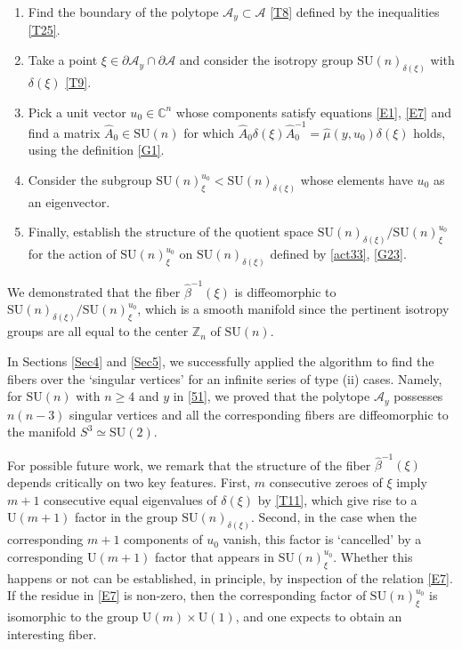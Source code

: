 \documentclass[a4paper,11pt,reqno]{amsart}
\theoremstyle{definition}
\numberwithin{equation}{section}
\def\cA{{\mathcal A}}                       %
\def\bC{{\mathbb C}}                        %
\def\bZ{{\mathbb Z}}                        %
\def\SU{\mathrm{SU}}                        %
\def\U{\mathrm{U}}                          %
\begin{document}
\begin{enumerate}

\item{Find the boundary of the polytope $\cA_y\subset \cA$ \eqref{T8} defined by the inequalities \eqref{T25}.}

\item{Take a point $\xi \in \partial \cA_y \cap \partial \cA$ and consider the isotropy group
$\SU(n)_{\delta(\xi)}$ with $\delta(\xi)$ \eqref{T9}.}


\item{Pick a unit vector $u_0\in \bC^n$ whose components satisfy equations \eqref{E1}, \eqref{E7}
and find a matrix $\hat A_0\in \SU(n)$ for which $\hat A_0 \delta(\xi) \hat A_0^{-1}= \hat \mu(y,u_0) \delta(\xi)$ holds,
using the definition \eqref{G1}}.


\item{Consider the subgroup $\SU(n)_\xi^{u_0} <\SU(n)_{\delta(\xi)}$ whose elements
have $u_0$ as an eigenvector.}



\item{Finally, establish the structure of the quotient space
$\SU(n)_{\delta(\xi)}/\SU(n)_\xi^{u_0}$  for the action of $\SU(n)_\xi^{u_0}$ on $\SU(n)_{\delta(\xi)}$
defined by  \eqref{act33}, \eqref{G23}.}

\end{enumerate}

\noindent
We demonstrated that the fiber $\hat \beta^{-1}(\xi)$ is diffeomorphic to
$\SU(n)_{\delta(\xi)}/\SU(n)_\xi^{u_0}$, which is a smooth manifold since the pertinent isotropy
groups are all equal to  the center $\bZ_n$ of $\SU(n)$.

In Sections \ref{Sec4} and \ref{Sec5}, we successfully applied the algorithm to find the fibers over the `singular
vertices' for an infinite
series of type (ii) cases.
Namely, for $\SU(n)$ with $n\geq 4$ and $y$ in \eqref{51}, we proved that the polytope $ \cA_y$ possesses $n(n-3)$ singular
vertices and all the corresponding fibers are diffeomorphic to the manifold $S^3\simeq \SU(2)$.

For possible future work, we remark
that the structure of the fiber $\hat \beta^{-1}(\xi)$ depends critically on two key features.
First, $m$ consecutive zeroes of $\xi$ imply $m+1$ consecutive equal eigenvalues of $\delta(\xi)$ by \eqref{T11}, which
give rise to a $\U(m+1)$ factor in the group $\SU(n)_{\delta(\xi)}$.
Second, in the case when the corresponding $m+1$ components of $u_0$ vanish, this factor is
 `cancelled' by a corresponding $\U(m+1)$  factor that appears in $\SU(n)_\xi^{u_0}$. Whether this happens or not
 can be established, in principle, by  inspection of the relation \eqref{E7}.
 If the residue in \eqref{E7} is non-zero, then the corresponding factor of $\SU(n)_\xi^{u_0}$
 is isomorphic to the group $\U(m)\times \U(1)$,  and one expects to obtain an interesting fiber.
\end{document}
